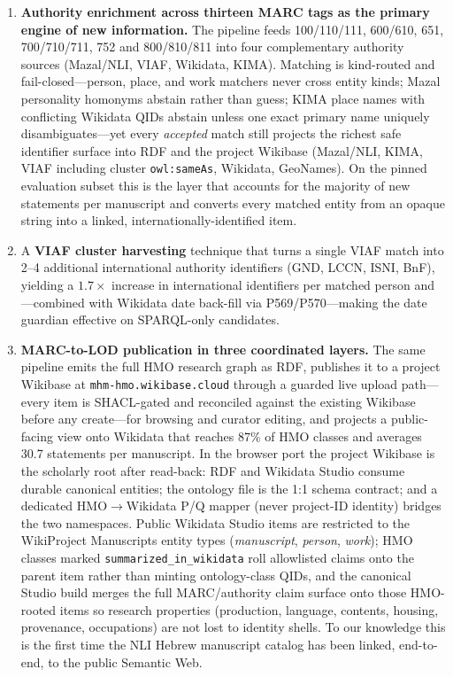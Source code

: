 \documentclass[Afour,sageh,times]{sagej}
\begin{document}
\begin{enumerate}[leftmargin=*]
\item \textbf{Authority enrichment across thirteen MARC tags as the primary engine of new information.} The pipeline feeds 100/110/111, 600/610, 651, 700/710/711, 752 and 800/810/811 into four complementary authority sources (Mazal/NLI, VIAF, Wikidata, KIMA). Matching is kind-routed and fail-closed---person, place, and work matchers never cross entity kinds; Mazal personality homonyms abstain rather than guess; KIMA place names with conflicting Wikidata QIDs abstain unless one exact primary name uniquely disambiguates---yet every \emph{accepted} match still projects the richest safe identifier surface into RDF and the project Wikibase (Mazal/NLI, KIMA, VIAF including cluster \texttt{owl:sameAs}, Wikidata, GeoNames). On the pinned evaluation subset this is the layer that accounts for the majority of new statements per manuscript and converts every matched entity from an opaque string into a linked, internationally-identified item.
\item A \textbf{VIAF cluster harvesting} technique that turns a single VIAF match into 2--4 additional international authority identifiers (GND, LCCN, ISNI, BnF), yielding a $1.7\times$ increase in international identifiers per matched person and---combined with Wikidata date back-fill via P569/P570---making the date guardian effective on SPARQL-only candidates.
\item \textbf{MARC-to-LOD publication in three coordinated layers.} The same pipeline emits the full HMO research graph as RDF, publishes it to a project Wikibase at \texttt{mhm-hmo.wikibase.cloud} through a guarded live upload path---every item is SHACL-gated and reconciled against the existing Wikibase before any create---for browsing and curator editing, and projects a public-facing view onto Wikidata that reaches 87\% of HMO classes and averages 30.7 statements per manuscript. In the browser port the project Wikibase is the scholarly root after read-back: RDF and Wikidata Studio consume durable canonical entities; the ontology file is the 1:1 schema contract; and a dedicated HMO$\to$Wikidata P/Q mapper (never project-ID identity) bridges the two namespaces. Public Wikidata Studio items are restricted to the WikiProject Manuscripts entity types (\emph{manuscript}, \emph{person}, \emph{work}); HMO classes marked \texttt{summarized\_in\_wikidata} roll allowlisted claims onto the parent item rather than minting ontology-class QIDs, and the canonical Studio build merges the full MARC/authority claim surface onto those HMO-rooted items so research properties (production, language, contents, housing, provenance, occupations) are not lost to identity shells. To our knowledge this is the first time the NLI Hebrew manuscript catalog has been linked, end-to-end, to the public Semantic Web.

\end{enumerate}
\end{document}

